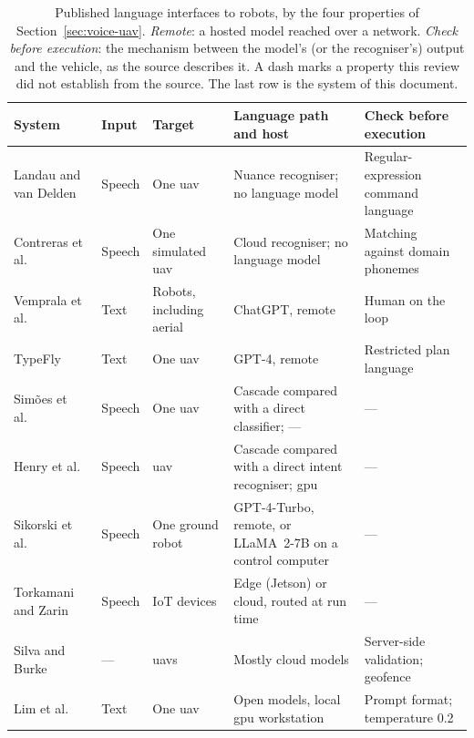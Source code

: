 \begin{table}[htbp]
\centering
\footnotesize
\caption[Published language interfaces to robots]{Published language interfaces to robots, by
the four properties of Section~\ref{sec:voice-uav}. \emph{Remote}: a hosted model reached over a
network. \emph{Check before execution}: the mechanism between the model's (or the recogniser's)
output and the vehicle, as the source describes it. A dash marks a property this review did not
establish from the source. The last row is the system of this document.}
\label{tab:voice-uav-survey}
\begin{tabularx}{\textwidth}{@{}>{\raggedright\arraybackslash}p{2.5cm} >{\raggedright\arraybackslash}p{1.7cm} >{\raggedright\arraybackslash}p{2.0cm} >{\raggedright\arraybackslash}X >{\raggedright\arraybackslash}X@{}}
\toprule
System & Input & Target & Language path and host & Check before execution \\
\midrule
Landau and van Delden~\cite{landau2017} & Speech & One \gls{uav} & Nuance recogniser; no language model & Regular-expression command language \\
Contreras et al.~\cite{contreras2020} & Speech & One simulated \gls{uav} & Cloud recogniser; no language model & Matching against domain phonemes \\
Vemprala et al.~\cite{chatgptrobotics2024} & Text & Robots, including aerial & ChatGPT, remote & Human on the loop \\
TypeFly~\cite{typefly2024} & Text & One \gls{uav} & GPT-4, remote & Restricted plan language \\
Sim\~oes et al.~\cite{simoes2024} & Speech & One \gls{uav} & Cascade compared with a direct classifier; --- & --- \\
Henry et al.~\cite{henry2026} & Speech & \gls{uav} & Cascade compared with a direct intent recogniser; \gls{gpu} & --- \\
Sikorski et al.~\cite{sikorski2025} & Speech & One ground robot & GPT-4-Turbo, remote, or LLaMA~2-7B on a control computer & --- \\
Torkamani and Zarin~\cite{torkamani2025} & Speech & IoT devices & Edge (Jetson) or cloud, routed at run time & --- \\
Silva and Burke~\cite{silva2026} & --- & \glspl{uav} & Mostly cloud models & Server-side validation; geofence \\
Lim et al.~\cite{lim2025} & Text & One \gls{uav} & Open models, local \gls{gpu} workstation & Prompt format; temperature 0.2 \\

\end{tabularx}
\end{table}

